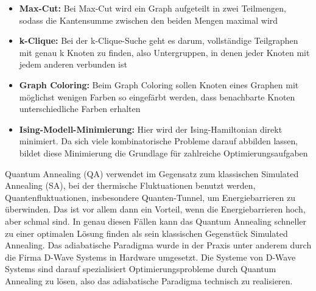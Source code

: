 \begin{itemize}
    \item \textbf{Max-Cut: }Bei Max-Cut wird ein Graph aufgeteilt in zwei Teilmengen, sodass die Kantensumme zwischen den beiden Mengen maximal wird 
    \item 	\textbf{k-Clique:} Bei der k-Clique-Suche geht es darum, vollständige Teilgraphen mit genau k Knoten zu finden, also Untergruppen, in denen jeder Knoten mit jedem anderen verbunden ist 
    \item \textbf{Graph Coloring: }Beim Graph Coloring sollen Knoten eines Graphen mit möglichst wenigen Farben so eingefärbt werden, dass benachbarte Knoten unterschiedliche Farben erhalten 
    \item \textbf{Ising-Modell-Minimierung:} Hier wird der Ising-Hamiltonian direkt minimiert. Da sich viele kombinatorische Probleme darauf abbilden lassen, bildet diese Minimierung die Grundlage für zahlreiche Optimierungsaufgaben 
\end{itemize}
Quantum Annealing (QA) verwendet im Gegensatz zum klassischen Simulated Annealing (SA), bei der thermische Fluktuationen benutzt werden, Quantenfluktuationen, insbesondere Quanten-Tunnel, um Energiebarrieren zu überwinden. Das ist vor allem dann ein Vorteil, wenn die Energiebarrieren hoch, aber schmal sind. In genau diesen Fällen kann das Quantum Annealing schneller zu einer optimalen Lösung finden als sein klassischen Gegenstück Simulated Annealing. 
Das adiabatische Paradigma wurde in der Praxis unter anderem durch die Firma D-Wave Systems in Hardware umgesetzt. Die Systeme von D-Wave Systems sind darauf spezialisiert Optimierungsprobleme durch Quantum Annealing zu lösen, also das adiabatische Paradigma technisch zu realisieren. 
